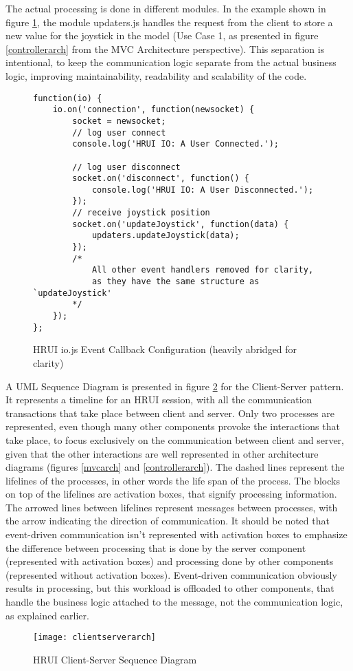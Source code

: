 The actual processing is done in different modules. In the example shown in figure \ref{iojs}, the module updaters.js handles 
the request from the client to store a new value for the joystick in the model (Use Case 1, as presented in figure 
\ref{controllerarch} from the MVC Architecture perspective). This separation is intentional, to keep the communication logic 
separate from the actual business logic, improving maintainability, readability and scalability of the code.\\
\begin{figure}[H]
\centering
\captionsetup{justification=centering}
\begin{verbatim}
function(io) {
    io.on('connection', function(newsocket) {
        socket = newsocket;
        // log user connect
        console.log('HRUI IO: A User Connected.');

        // log user disconnect
        socket.on('disconnect', function() {
            console.log('HRUI IO: A User Disconnected.');
        });
        // receive joystick position
        socket.on('updateJoystick', function(data) {
            updaters.updateJoystick(data);
        });
        /* 
        	All other event handlers removed for clarity,
        	as they have the same structure as `updateJoystick'
        */
    });
};
\end{verbatim}
\caption{HRUI io.js Event Callback Configuration (heavily abridged for clarity)\label{iojs}}
\end{figure}

A UML Sequence Diagram is presented in figure \ref{clientserverarch} for the Client-Server pattern. It represents a timeline 
for an HRUI session, with all the communication transactions that take place between client and server. Only two processes are 
represented, even though many other components provoke the interactions that take place, to focus exclusively on the 
communication between client and server, given that the other interactions are well represented in other architecture diagrams 
(figures \ref{mvcarch} and \ref{controllerarch}). The dashed lines represent the lifelines of the processes, in other words 
the life span of the process. The blocks on top of the lifelines are activation boxes, that signify processing information. 
The arrowed lines between lifelines represent messages between processes, with the arrow indicating the direction of 
communication. It should be noted that event-driven communication isn't represented with activation boxes to emphasize the 
difference between processing that is done by the server component (represented with activation boxes) and processing done by 
other components (represented without activation boxes). Event-driven communication obviously results in processing, but this 
workload is offloaded to other components, that handle the business logic attached to the message, not the communication 
logic, as explained earlier.
\begin{figure}[H]
\centering
\captionsetup{justification=centering}
\texttt{[image: clientserverarch]}
\caption{HRUI Client-Server Sequence Diagram \label{clientserverarch}}
\end{figure}
